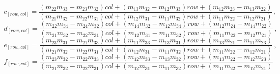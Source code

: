 \begin{equation*}%
c_{[row, col]} %
= \frac%
{(m_{22}m_{33} - m_{23}m_{32})col + (m_{13}m_{32} - m_{12}m_{33})row + (m_{12}m_{23} - m_{13}m_{22})}%
{(m_{21}m_{32} - m_{22}m_{31})col + (m_{12}m_{31} - m_{11}m_{32})row + (m_{11}m_{22} - m_{12}m_{21})} \, ,
\end{equation*}
%
\begin{equation*}%
d_{[row, col]} %
= \frac%
{(m_{22}m_{34} - m_{24}m_{32})col + (m_{14}m_{32} - m_{12}m_{34})row + (m_{12}m_{24} - m_{14}m_{22})}%
{(m_{21}m_{32} - m_{22}m_{31})col + (m_{12}m_{31} - m_{11}m_{32})row + (m_{11}m_{22} - m_{12}m_{21})} \, ,
\end{equation*}
%
\begin{equation*}%
e_{[row, col]} %
= \frac%
{(m_{23}m_{31} - m_{21}m_{33})col + (m_{11}m_{33} - m_{13}m_{31})row + (m_{13}m_{21} - m_{11}m_{23})}%
{(m_{21}m_{32} - m_{22}m_{31})col + (m_{12}m_{31} - m_{11}m_{32})row + (m_{11}m_{22} - m_{12}m_{21})} \, ,
\end{equation*}
%
\begin{equation*}%
f_{[row, col]} %
= \frac%
{(m_{23}m_{32} - m_{22}m_{33})col + (m_{12}m_{33} - m_{13}m_{32})row + (m_{13}m_{22} - m_{12}m_{23})}%
{(m_{21}m_{32} - m_{22}m_{31})col + (m_{12}m_{31} - m_{11}m_{32})row + (m_{11}m_{22} - m_{12}m_{21})}
\end{equation*}





















